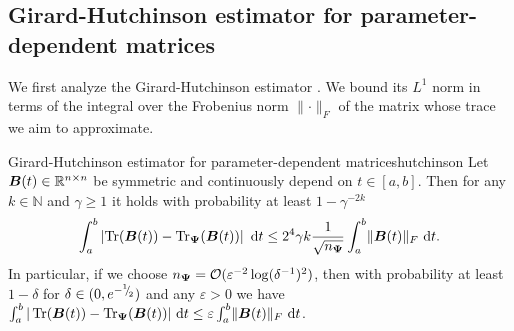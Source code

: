 \documentclass[12pt]{article}
\begin{document}
%

\subsection{Girard-Hutchinson estimator for parameter-dependent matrices}
\label{subsec:hutchinson}

We first analyze the Girard-Hutchinson estimator . We bound its $L^1$ norm in terms of the integral over the Frobenius norm $\lVert \cdot \rVert _F$ of the matrix whose trace we aim to approximate.

\begin{theorem}{Girard-Hutchinson estimator for parameter-dependent matrices}{hutchinson}
    Let $\boldsymbol{B}(t) \in \mathbb{R}^{n \times n}$ be symmetric and continuously depend on $t \in [a, b]$. Then for any $k \in \mathbb{N}$ and $\gamma \geq 1$ it holds with probability at least $1 - \gamma^{-2k}$
    \begin{equation}
        \int_{a}^{b} \left| \operatorname{Tr}(\boldsymbol{B}(t)) - \operatorname{Tr}_{\boldsymbol{\Psi}}(\boldsymbol{B}(t)) \right| ~\mathrm{d}t \leq 2^4 \gamma k \frac{1}{\sqrt{n_{\boldsymbol{\Psi}}}} \int_{a}^{b} \lVert \boldsymbol{B}(t) \rVert _F  ~\mathrm{d}t.
    \end{equation}
    In particular, if we choose $n_{\boldsymbol{\Psi}} = \mathcal{O}(\varepsilon^{-2} \log(\delta^{-1})^2)$, then with probability at least $1-\delta$ for $\delta \in (0, e^{- {}^{1}{\mskip -5mu/\mskip -3mu}_{2}})$ and any $\varepsilon > 0$ we have $\int_{a}^{b} | \operatorname{Tr}(\boldsymbol{B}(t)) - \operatorname{Tr}_{\boldsymbol{\Psi}}(\boldsymbol{B}(t)) | ~\mathrm{d}t \leq \varepsilon \int_{a}^{b} \lVert \boldsymbol{B}(t) \rVert _F~\mathrm{d}t$.
\end{theorem}
\end{document}
